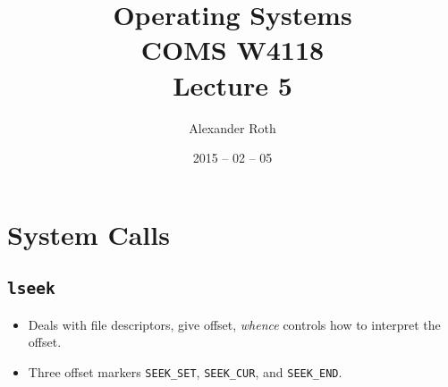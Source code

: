 \documentclass[]{article}
\newcommand{\code}{\texttt}
\begin{document}
\newtheorem{thm}{Theorem}
\title{Operating Systems \\ COMS W4118 \\ Lecture 5}
\author{Alexander Roth}
\date{2015 -- 02 -- 05}
\maketitle

\section{System Calls}
\subsection{\code{lseek}}
\begin{itemize}
\item Deals with file descriptors, give offset, \emph{whence} controls how to
interpret the offset.
\item Three offset markers \code{SEEK\_SET}, \code{SEEK\_CUR}, and
\code{SEEK\_END}.
\end{itemize}
\end{document}
